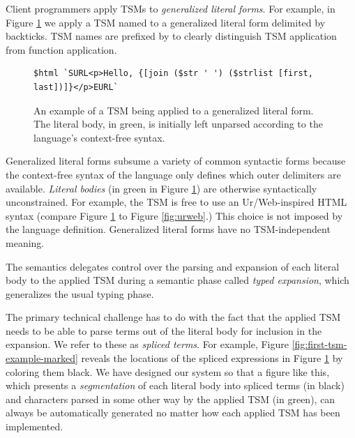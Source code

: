 Client programmers apply TSMs to \emph{generalized literal forms}. For example, in Figure \ref{fig:first-tsm-example} we apply a TSM named  to a generalized literal form delimited by backticks. TSM names are prefixed by \li{#\dolla#} to clearly distinguish TSM application from function application.
\begin{figure}[ht!]
\begin{lstlisting}[numbers=none,xleftmargin=0px]
$html `SURL<p>Hello, {[join ($str ' ') ($strlist [first, last])]}</p>EURL`
\end{lstlisting}
\caption{An example of a TSM being applied to a generalized literal form. The literal body, in green, is initially left unparsed according to the language's context-free syntax.}
\label{fig:first-tsm-example}
\end{figure}

Generalized literal forms subsume a variety of common syntactic forms because the context-free syntax of the language only defines which outer delimiters are available. \emph{Literal bodies} (in green in Figure \ref{fig:first-tsm-example}) are otherwise syntactically unconstrained. For example, the  TSM is free to use an Ur/Web-inspired HTML syntax (compare Figure \ref{fig:first-tsm-example} to Figure \ref{fig:urweb}.) This choice is not imposed by the language definition. Generalized literal forms have no TSM-independent meaning.

The semantics delegates control over the parsing and expansion of each literal body to the applied TSM during a semantic phase called \emph{typed expansion}, which generalizes the usual typing phase. %

The primary technical challenge has to do with the fact that the applied TSM needs to be able to parse terms out of the literal body for inclusion in the expansion. We refer to these as \emph{spliced terms}. For example, Figure \ref{fig:first-tsm-example-marked} reveals the locations of the spliced expressions in Figure \ref{fig:first-tsm-example} by coloring them black. We have designed our system so that a figure like this, which presents a \emph{segmentation} of each literal body into spliced terms (in black) and characters parsed in some other way by the applied TSM (in green), can always be automatically generated no matter how each applied TSM has been implemented. 

